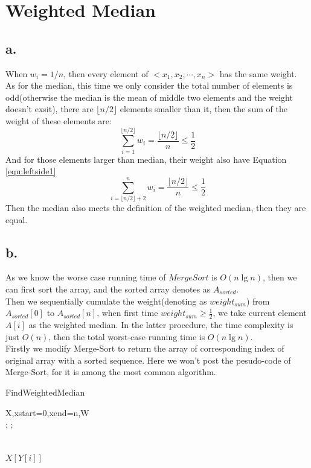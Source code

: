\documentclass[oneside]{homework} %
\begin{document}
\maketitle
\newpage
\section{Weighted Median}
\subsection* {a.}
When $w_{i} = 1/n$, then every element of $<x_{1},x_{2},\cdots,x_{n}>$ has the same weight.\\
As for the median, this time we only consider the total number of elements is odd(otherwise the median is the mean of middle two elements and the weight doesn't exsit), there are $\lfloor n/2 \rfloor$ elements smaller than it, then the sum of the weight of these elements are: 
\begin{equation}
  \sum_{i=1}^{\lfloor n/2 \rfloor} w_{i} = \frac{\lfloor n/2 \rfloor}{n} \leq \frac{1}{2} 
  \label{equ:leftside1}
\end{equation}
And for those elements larger than median, their weight also have Equation \ref{equ:leftside1}
\begin{equation}
  \sum_{i=\lfloor n/2 \rfloor+2}^{n} w_{i} = \frac{\lfloor n/2 \rfloor}{n} \leq \frac{1}{2} 
  \label{equ:rightside1}
\end{equation}
Then the median also meets the definition of the weighted median, then they are equal.
\subsection* {b.}
As we know the worse case running time of $Merge Sort$ is $O(n\lg n)$, then we can first sort the array, and the sorted array denotes as $A_{sorted}$. \\
Then we sequentially cumulate the weight(denoting as $weight_{sum}$) from $A_{sorted}[0]$ to $A_{sorted}[n]$, when first time $weight_{sum} \geq \frac{1}{2}$, we take current element $A[i]$ as the weighted median. In the latter procedure, the time complexity is just $O(n)$, then the total worst-case running time is $O(n \lg n)$.
\\ Firstly we modify Merge-Sort to return the array of corresponding index of original array with a sorted sequence. Here we won't post the pesudo-code of Merge-Sort, for it is among the most common algorithm.

  \begin{algorithm}[h]
  \caption{FindWeightedMedian}
  \label{algo:weightmedian}
  \begin{algorithmic}[1]
	\REQUIRE X,xstart=0,xend=n,W
	\ENSURE ~ ~\\ 
	;
	;
	 \\	
	 \\
	 \\
	\ENDWHILE
	\LASTCON $X[Y[i]]$	
  \end{algorithmic}
  \end{algorithm}
\end{document}
